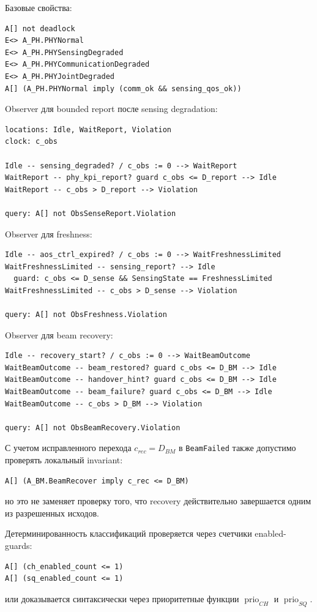 \documentclass[10pt,a4paper]{article}
\newcommand{\code}[1]{\texttt{#1}}
\newcommand{\prio}{\operatorname{prio}}
\begin{document}
Базовые свойства:
\begin{verbatim}
A[] not deadlock
E<> A_PH.PHYNormal
E<> A_PH.PHYSensingDegraded
E<> A_PH.PHYCommunicationDegraded
E<> A_PH.PHYJointDegraded
A[] (A_PH.PHYNormal imply (comm_ok && sensing_qos_ok))
\end{verbatim}

Observer для bounded report после sensing degradation:
\begin{verbatim}
locations: Idle, WaitReport, Violation
clock: c_obs

Idle -- sensing_degraded? / c_obs := 0 --> WaitReport
WaitReport -- phy_kpi_report? guard c_obs <= D_report --> Idle
WaitReport -- c_obs > D_report --> Violation

query: A[] not ObsSenseReport.Violation
\end{verbatim}

Observer для freshness:
\begin{verbatim}
Idle -- aos_ctrl_expired? / c_obs := 0 --> WaitFreshnessLimited
WaitFreshnessLimited -- sensing_report? --> Idle
  guard: c_obs <= D_sense && SensingState == FreshnessLimited
WaitFreshnessLimited -- c_obs > D_sense --> Violation

query: A[] not ObsFreshness.Violation
\end{verbatim}

Observer для beam recovery:
\begin{verbatim}
Idle -- recovery_start? / c_obs := 0 --> WaitBeamOutcome
WaitBeamOutcome -- beam_restored? guard c_obs <= D_BM --> Idle
WaitBeamOutcome -- handover_hint? guard c_obs <= D_BM --> Idle
WaitBeamOutcome -- beam_failure? guard c_obs <= D_BM --> Idle
WaitBeamOutcome -- c_obs > D_BM --> Violation

query: A[] not ObsBeamRecovery.Violation
\end{verbatim}
С учетом исправленного перехода \(c_{rec}=D_{BM}\) в \code{BeamFailed} также допустимо проверять локальный invariant:
\begin{verbatim}
A[] (A_BM.BeamRecover imply c_rec <= D_BM)
\end{verbatim}
но это не заменяет проверку того, что recovery действительно завершается одним из разрешенных исходов.

Детерминированность классификаций проверяется через счетчики enabled-guards:
\begin{verbatim}
A[] (ch_enabled_count <= 1)
A[] (sq_enabled_count <= 1)
\end{verbatim}
или доказывается синтаксически через приоритетные функции \(\prio_{CH}\) и \(\prio_{SQ}\).
\end{document}
